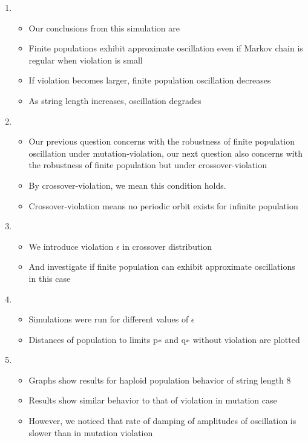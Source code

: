 \documentclass{article}
\begin{document}
\begin{enumerate}
  
\item
  \begin{itemize}
  \item Our conclusions from this simulation are
  \item Finite populations exhibit approximate oscillation even if Markov chain is regular when violation is small
  \item If violation becomes larger, finite population oscillation decreases
  \item As string length increases, oscillation degrades
  \end{itemize}
  
\item
  \begin{itemize}
  \item Our previous question concerns with the robustness of finite population oscillation under mutation-violation, 
  our next question also concerns with the robustness of finite population but under crossover-violation 
  \item By crossover-violation, we mean this condition holds.
  \item Crossover-violation means no periodic orbit exists for infinite population
  \end{itemize}

\item
  \begin{itemize}
  \item We introduce violation $\epsilon$ in crossover distribution
  
  \item And investigate if finite population can exhibit approximate oscillations in this case     
  \end{itemize}
  
\item
  \begin{itemize}
  \item Simulations were run for different values of $\epsilon$
  \item Distances of population to limits p∗ and q∗ without violation are plotted  
  \end{itemize}
  
\item
  \begin{itemize}
  \item Graphs show results for haploid population behavior of string length 8
  \item Results show similar behavior to that of violation in mutation case
  \item However, we noticed that rate of damping of amplitudes of oscillation is slower than in mutation violation 
  

\end{itemize}
\end{enumerate}
\end{document}
